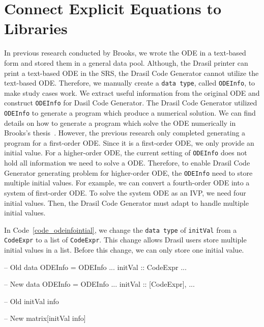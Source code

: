 \section{Connect Explicit Equations to Libraries}
\label{se_connecteetolib}

In previous research conducted by Brooks, we wrote the ODE in a text-based form and stored them in a general data pool. Although, the Drasil printer can print a text-based ODE in the SRS, the Drasil Code Generator cannot utilize the text-based ODE. Therefore, we manually create a \verb|data type|, called \verb|ODEInfo|, to make study cases work. We extract useful information from the original ODE and construct \verb|ODEInfo| for Dasil Code Generator. The Drasil Code Generator utilized \verb|ODEInfo| to generate a program which produce a numerical solution. We can find details on how to generate a program which solve the ODE numerically in Brooks's thesis~\citep{brooks}. However, the previous research only completed generating a program for a first-order ODE. Since it is a first-order ODE, we only provide an initial value. For a higher-order ODE, the current setting of \verb|ODEInfo| does not hold all information we need to solve a ODE. Therefore, to enable Drasil Code Generator generating problem for higher-order ODE, the \verb|ODEInfo| need to store multiple initial values. For example, we can convert a fourth-order ODE into a system of first-order ODE. To solve the system ODE as an IVP, we need four initial values. Then, the Drasil Code Generator must adapt to handle multiple initial values.

In Code~\ref{code_odeinfointial}, we change the \verb|data type| of \verb|initVal| from a \verb|CodeExpr| to a list of \verb|CodeExpr|. This change allows Drasil users store multiple initial values in a list. Before this change, we can only store one initial value. 

\begin{listing}[ht]
\begin{haskell1}
-- Old 
data ODEInfo = ODEInfo {
  ...
  initVal :: CodeExpr
  ...
}

-- New 
data ODEInfo = ODEInfo {
  ...
  initVal :: [CodeExpr],
  ...
}
\end{haskell1}
\label{code_odeinfointial}
\end{listing}

\begin{listing}[ht]
\begin{haskell1}
-- Old 
initVal info

-- New 
matrix[initVal info]  
\end{haskell1}
\label{code_odeinfointialcodegen}
\end{listing}

